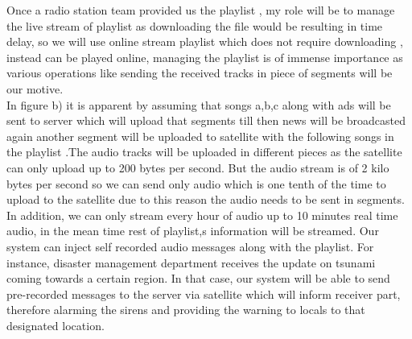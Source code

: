 Once a radio station team provided us the playlist , my role will be to manage the  live stream of playlist as downloading the file would be resulting in time delay, so we will use online stream playlist which does not require downloading , instead can be played online, managing the  playlist is of immense importance as various operations like sending the received tracks in piece of segments  will be our motive.\\
 In figure b) it is apparent  by assuming that songs a,b,c along with ads will be sent to server  which will upload that segments till then news will be broadcasted  again another segment will be uploaded to satellite with the following songs in the playlist .The audio tracks will be uploaded in different pieces as the satellite can only upload up to 200 bytes per second. But the audio stream is of 2 kilo bytes per second  so we can send only audio which is one tenth of the time  to upload to the satellite due to this reason the audio needs to be sent in segments.\\
 In addition, we can only stream every hour of audio up to 10 minutes real time audio, in the mean time rest of  playlist,s information will be streamed. Our system can inject self recorded audio messages along with the playlist. For instance, disaster management department receives the update on tsunami coming towards a certain region. In that case, our system will be able to send pre-recorded messages to the server via satellite which will inform receiver part, therefore alarming the sirens and providing the warning to locals to that designated location.

